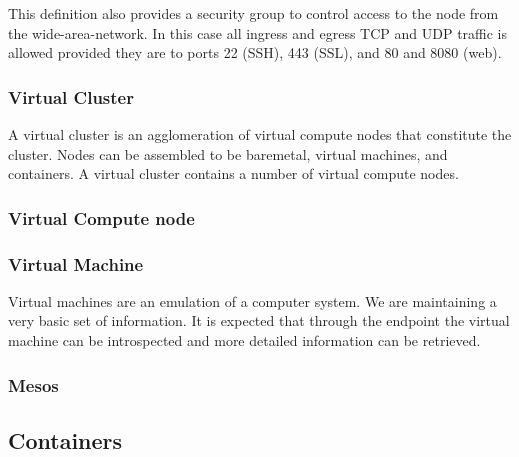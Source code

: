 \documentclass[10pt]{article}
\begin{document}
This definition also provides a security group to control access to
the node from the wide-area-network. In this case all ingress and
egress TCP and UDP traffic is allowed provided they are to ports 22
(SSH), 443 (SSL), and 80 and 8080 (web).





\subsubsection{Virtual Cluster}

A virtual cluster is an agglomeration of virtual compute nodes that
constitute the cluster. Nodes can be assembled to be baremetal,
virtual machines, and containers. A virtual cluster contains a number
of virtual compute nodes.  
 

\subsubsection{Virtual Compute node}


\subsubsection{Virtual Machine}

Virtual machines are an emulation of a computer system. We are
maintaining a very basic set of information. It is expected that
through the endpoint the virtual machine can be introspected and more
detailed information can be retrieved.


\subsubsection{Mesos}



\subsection{Containers}
\end{document}
